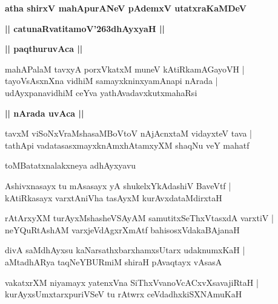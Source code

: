 \documentclass[twoside,12pt,openright]{book}
\def\S{\char'263}
\newcounter{shloka}[chapter]
\def\uvaca#1{\centerline{{\large\textbf{#1}}}}
\begin{document}
\begin{center}
{\LARGE\bfseries atha shirxV mahApurANeV pAdemxV utatxraKaMDeV}
\end{center}

\begin{center}
{\LARGE\bfseries || catunaRvatitamoV\S dhAyxyaH || }
\end{center}

\uvaca{|| paqthuruvAca ||}

\begin{shloka}%
mahAPalaM tavxyA porxVkatxM muneV kAtiRkamAGayoVH |\\
tayoVsAsxnXna vidhiM samayxkninxyamAnapi nArada |\\
udAyxpanavidhiM ceYva yathAvadavxkutxmahaRsi
\end{shloka}

\uvaca{|| nArada uvAca ||}

\begin{shloka}%
tavxM viSoNxVraMshasaMBoVtoV nAjAcnxtaM vidayxteV tava |\\
tathApi vadatasasxmayxknAmxhAtamxyXM shaqNu veY mahatf 
\end{shloka}

\begin{center}
toMBatatxnalakxneya adhAyxyavu
\end{center}

\begin{shloka}%
Ashivxnasayx tu mAsasayx yA shukelxYkAdashiV BaveVtf |\\
kAtiRkasayx varxtAniVha tasAyxM kurAvxdataMdirxtaH
\end{shloka}

\begin{shloka}%
rAtArxyXM turAyxMshasheVSAyAM samutitxSeThxVtasxdA varxtiV |\\
neYQuRtAshAM varxjeVdAgxrXmAtf bahisosxVdakaBAjanaH 
\end{shloka}

\begin{shloka}%
divA saMdhAyxsu kaNarsathxbarxhamxsUtarx udaknumxKaH |\\
aMtadhARya taqNeYBURmiM shiraH pAvaqtayx vAsasA 
\end{shloka}

\begin{shloka}%
vakatxrXM niyamayx yatenxVna SiThxVvanoVcACxvXsavajiRtaH |\\
kurAyxsUmxtarxpuriVSeV tu rAtwrx ceVdadhxkiSXNAmuKaH 
\end{shloka}
\end{document}
